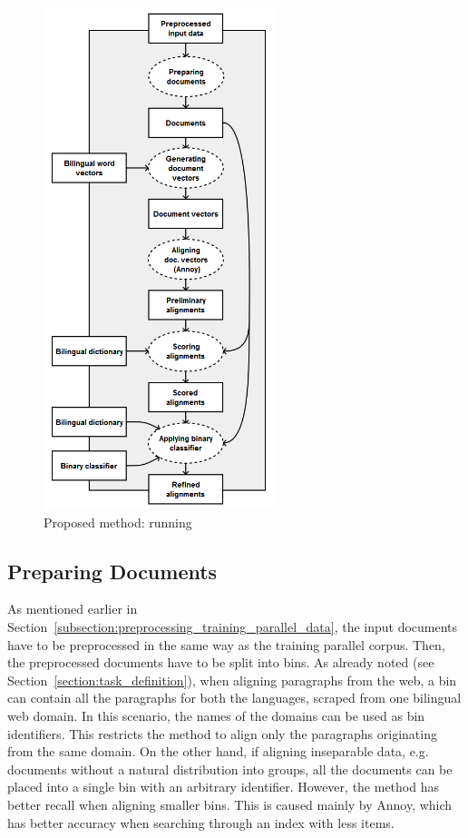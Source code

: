 \begin{figure}[!htb]
	\centering
	\caption{Proposed method: running}
	\label{figure:method_3}
	\vspace{1em}
	\includegraphics[width=0.60\textwidth]{images/method_3.png}
\end{figure}

\subsection{Preparing Documents}
\label{subsection:preparing_documents_running}

As mentioned earlier in Section~\ref{subsection:preprocessing_training_parallel_data}, the input documents have to be preprocessed in the same way as the training parallel corpus. Then, the preprocessed documents have to be split into bins. As already noted (see Section~\ref{section:task_definition}), when aligning paragraphs from the web, a bin can contain all the paragraphs for both the languages, scraped from one bilingual web domain. In this scenario, the names of the domains can be used as bin identifiers. This restricts the method to align only the paragraphs originating from the same domain. On the other hand, if aligning inseparable data, e.g. documents without a natural distribution into groups, all the documents can be placed into a single bin with an arbitrary identifier. However, the method has better recall when aligning smaller bins. This is caused mainly by Annoy, which has better accuracy when searching through an index with less items.

